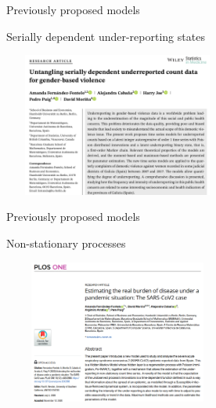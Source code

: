 \documentclass[aspectratio=169,usepdftitle=true]{beamer}
\begin{document}
\begin{frame}[c]{Previously proposed models}
    \begin{block}{Serially dependent under-reporting states}
        \begin{center}
           \includegraphics[height=4.7cm,width=7.5cm]{SiM2.png}
        \end{center}
    \end{block}
\end{frame}

\begin{frame}[c]{Previously proposed models}
    \begin{block}{Non-stationary processes}
        \begin{center}
           \includegraphics[height=4.7cm,width=7.5cm]{Plos.png}
        \end{center}
    \end{block}
\end{frame}
\end{document}
